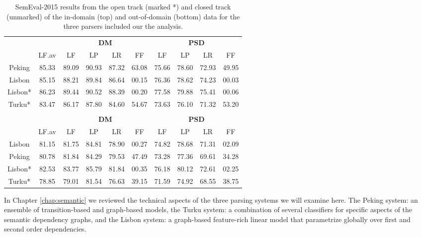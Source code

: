 \begin{table}
    \centering
    \begin{tabular}{@{}cccccccccc@{}}
        \toprule
        \multicolumn{1}{c}{ }
        & \multicolumn{1}{c}{ }
        & \multicolumn{4}{c}{\textbf{DM}}
        & \multicolumn{4}{c}{\textbf{PSD}} \\
        \cmidrule(lr){3-6}
        \cmidrule(lr){7-10}
        &
        LF.av &
        LF & LP & LR & FF &
        LF & LP & LR & FF \\
        \midrule
        Peking & 85.33 & 89.09 & 90.93 & 87.32 & 63.08 & 75.66 & 78.60 & 72.93 & 49.95 \\
        Lisbon & 85.15 & 88.21 & 89.84 & 86.64 & 00.15 & 76.36 & 78.62 & 74.23 & 00.03 \\
        Lisbon* & 86.23 & 89.44 & 90.52 & 88.39 & 00.20 & 77.58 & 79.88 & 75.41 & 00.06 \\
        Turku* & 83.47 & 86.17 & 87.80 & 84.60 & 54.67 & 73.63 & 76.10 & 71.32 & 53.20 \\
        \bottomrule
        
        \\
        \toprule
        \multicolumn{1}{c}{ }
        & \multicolumn{1}{c}{ }
        & \multicolumn{4}{c}{\textbf{DM}}
        & \multicolumn{4}{c}{\textbf{PSD}} \\
        \cmidrule(lr){3-6}
        \cmidrule(lr){7-10}
        &
        LF.av &
        LF & LP & LR & FF &
        LF & LP & LR & FF \\
        \midrule
        Lisbon & 81.15 & 81.75 & 84.81 & 78.90 & 00.27 & 74.82 & 78.68 & 71.31 & 02.09 \\
        Peking & 80.78 & 81.84 & 84.29 & 79.53 & 47.49 & 73.28 & 77.36 & 69.61 & 34.28 \\
        Lisbon* & 82.53 & 83.77 & 85.79 & 81.84 & 00.35 & 76.18 & 80.12 & 72.61 & 02.25 \\
        Turku* & 78.85 & 79.01 & 81.54 & 76.63 & 39.15 & 71.59 & 74.92 & 68.55 & 38.75 \\
        \bottomrule
    \end{tabular}
    \caption{SemEval-2015 results from the open track (marked *) and closed track (unmarked) of the in-domain (top) and out-of-domain (bottom) data for the three parsers included our the analysis.}
    \label{fig:data:recap}
\end{table}

In Chapter \ref{chap:semantic} we reviewed the technical aspects of the three parsing systems we will examine here. The Peking system: an ensemble of transition-based and graph-based models, the Turku system: a combination of several classifiers for specific aspects of the semantic dependency graphs, and the Lisbon system: a graph-based feature-rich linear model that parametrize globally over first and second order dependencies.

